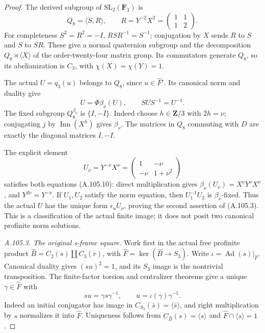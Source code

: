 \begin{proof}
The derived subgroup of \(\mathrm{SL}_2(\mathbf F_3)\) is
\[
 Q_8=\langle S,R\rangle,\qquad
 R=Y^{-2}X^2=\begin{pmatrix}1&1\\1&2\end{pmatrix}.
\]
For completeness \(S^2=R^2=-I\), \(RSR^{-1}=S^{-1}\);
conjugation by \(X\) sends \(R\) to \(S\) and \(S\) to \(SR\).
These give a normal quaternion subgroup and the decomposition
\(Q_8\rtimes\langle X\rangle\) of the order-twenty-four matrix
group. Its commutators generate \(Q_8\), so its abelianization
is \(C_3\), with \(\chi(X)=\chi(Y)=1\).

The actual \(U=q_3(u)\) belongs to \(Q_8\), since \(u\in\widehat F'\).
Its canonical norm and duality give
\[
 U=\Phi\beta_\nu(U),\qquad SUS^{-1}=U^{-1}.
\tag{A.105.10}
\]
The fixed subgroup \(Q_8^{\beta_\nu}\) is \(\{I,-I\}\).
Indeed choose \(h\in\mathbf Z/3\) with \(2h=\nu\); conjugating
\(j\) by \(\operatorname{Inn}(X^h)\) gives \(\beta_\nu\).
The matrices in \(Q_8\) commuting with \(D\) are exactly the
diagonal matrices \(I,-I\).

The explicit element
\[
 U_\nu=Y^{-\nu}X^\nu
 =\begin{pmatrix}1&-\nu\\-\nu&1+\nu^2\end{pmatrix}
\tag{A.105.11}
\]
satisfies both equations (A.105.10): direct multiplication gives
\(\beta_\nu(U_\nu)=X^\nu Y^\nu X^\nu\), and
\(Y^{2\nu}=Y^{-\nu}\). If \(U_1,U_2\) satisfy the norm equation,
then \(U_1^{-1}U_2\) is \(\beta_\nu\)-fixed. Thus the actual
\(U\) has the unique form \(\epsilon_uU_\nu\), proving the
second assertion of (A.105.3). This is a classification of the
actual finite image; it does not posit two canonical profinite
norm solutions.

\emph{A.105.3. The original s-frame square.}
Work first in the actual free profinite product
\(\widehat B=C_2(s)\amalg C_3(r)\), with
\(\widehat F=\ker(\widehat B\to S_3)\). Write
\(\iota=\operatorname{Ad}(s)|_{\widehat F}\).
Canonical duality gives \((su)^2=1\), and its \(S_3\) image
is the nontrivial transposition. The finite-factor torsion and
centralizer theorems \cite[Theorems A' and B']{A_HR1985}
give a unique \(\gamma\in\widehat F\) with
\[
 su=\gamma s\gamma^{-1},\qquad
 u=\iota(\gamma)\gamma^{-1}.
\tag{A.105.12}
\]
Indeed an initial conjugator has image in
\(C_{S_3}(\bar s)=\langle\bar s\rangle\), and right multiplication
by \(s\) normalizes it into \(\widehat F\). Uniqueness follows
from \(C_{\widehat B}(s)=\langle s\rangle\) and
\(\widehat F\cap\langle s\rangle=1\).


\end{proof}
